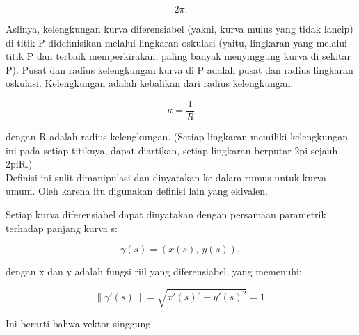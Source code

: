 \documentclass{article}
\begin{document}
\begin{eulernotebook}
\begin{eulercomment}
\begin{eulercomment}
\begin{eulercomment}
\begin{eulercomment}
\begin{eulercomment}
\end{eulercomment}
\begin{eulerformula}
\[
2\pi.
\]
\end{eulerformula}
\begin{eulercomment}
\end{eulercomment}
\begin{eulercomment}
Aslinya, kelengkungan kurva diferensiabel (yakni, kurva mulus yang
tidak lancip) di titik P didefinisikan melalui lingkaran oskulasi
(yaitu, lingkaran yang melalui titik P dan terbaik memperkirakan,
paling banyak menyinggung kurva di sekitar P). Pusat dan radius
kelengkungan kurva di P adalah pusat dan radius lingkaran oskulasi.
Kelengkungan adalah kebalikan dari radius kelengkungan:

\end{eulercomment}
\begin{eulerformula}
\[
\kappa =\frac {1}{R}
\]
\end{eulerformula}
\begin{eulercomment}
dengan R adalah radius kelengkungan. (Setiap lingkaran memiliki
kelengkungan ini pada setiap titiknya, dapat diartikan, setiap
lingkaran berputar 2pi sejauh 2piR.)\\
Definisi ini sulit dimanipulasi dan dinyatakan ke dalam rumus untuk
kurva umum. Oleh karena itu digunakan definisi lain yang ekivalen.

\end{eulercomment}
\begin{eulercomment}
Setiap kurva diferensiabel dapat dinyatakan dengan persamaan
parametrik terhadap panjang kurva s:

\end{eulercomment}
\begin{eulerformula}
\[
\gamma(s) = (x(s),\ y(s)),
\]
\end{eulerformula}
\begin{eulercomment}
dengan x dan y adalah fungsi riil yang diferensiabel, yang memenuhi:

\end{eulercomment}
\begin{eulerformula}
\[
\|\gamma'(s)\|=\sqrt{x'(s)^2+y'(s)^2}=1.
\]
\end{eulerformula}
\begin{eulercomment}
Ini berarti bahwa vektor singgung



\end{eulercomment}
\end{eulercomment}
\end{eulercomment}
\end{eulercomment}
\end{eulercomment}
\end{eulernotebook}
\end{document}
